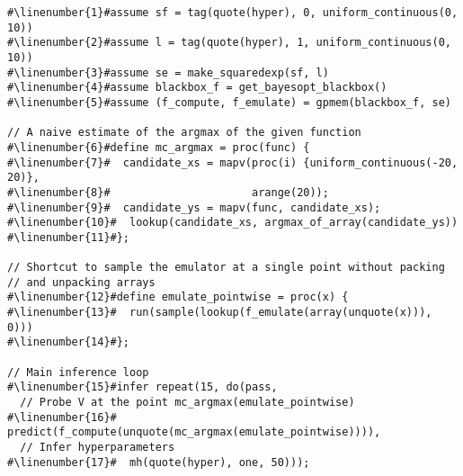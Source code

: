 \begin{mdframed}
\begin{minipage}{\linewidth}
\small
\belowcaptionskip=-10pt
\begin{lstlisting}[caption={Bayesian optimization using \gpmem},mathescape,numbers=none,label=alg:bayesopt,escapechar=\#]
#\linenumber{1}#assume sf = tag(quote(hyper), 0, uniform_continuous(0, 10))
#\linenumber{2}#assume l = tag(quote(hyper), 1, uniform_continuous(0, 10))
#\linenumber{3}#assume se = make_squaredexp(sf, l)
#\linenumber{4}#assume blackbox_f = get_bayesopt_blackbox()
#\linenumber{5}#assume (f_compute, f_emulate) = gpmem(blackbox_f, se)

// A naive estimate of the argmax of the given function
#\linenumber{6}#define mc_argmax = proc(func) {
#\linenumber{7}#  candidate_xs = mapv(proc(i) {uniform_continuous(-20, 20)},
#\linenumber{8}#                      arange(20));
#\linenumber{9}#  candidate_ys = mapv(func, candidate_xs);
#\linenumber{10}#  lookup(candidate_xs, argmax_of_array(candidate_ys))
#\linenumber{11}#};

// Shortcut to sample the emulator at a single point without packing
// and unpacking arrays
#\linenumber{12}#define emulate_pointwise = proc(x) {
#\linenumber{13}#  run(sample(lookup(f_emulate(array(unquote(x))), 0)))
#\linenumber{14}#};

// Main inference loop
#\linenumber{15}#infer repeat(15, do(pass,
  // Probe V at the point mc_argmax(emulate_pointwise)
#\linenumber{16}#  predict(f_compute(unquote(mc_argmax(emulate_pointwise)))),
  // Infer hyperparameters
#\linenumber{17}#  mh(quote(hyper), one, 50)));
\end{lstlisting}

\end{minipage}
\end{mdframed}
